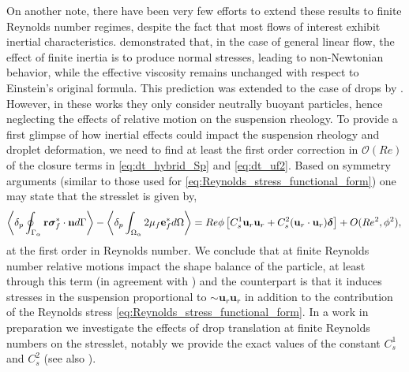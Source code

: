 On another note, there have been very few efforts to extend these results to finite Reynolds number regimes, despite the fact that most flows of interest exhibit inertial characteristics. 
\citet{stone2001inertial} demonstrated that, in the case of general linear flow, the effect of finite inertia is to produce normal stresses, leading to non-Newtonian behavior, while the effective viscosity remains unchanged with respect to Einstein's original formula. 
This prediction was extended to the case of drops by \citet{raja2010inertial}. 
However, in these works they only consider neutrally buoyant particles, hence neglecting the effects of relative motion on the suspension rheology. 
To provide a first glimpse of how inertial effects could impact the suspension rheology and droplet deformation, we need to find at least the first order correction in $\mathcal{O}(Re)$ of the closure terms in \ref{eq:dt_hybrid_Sp} and \ref{eq:dt_uf2}. 
Based on symmetry arguments (similar to those used for \ref{eq:Reynolds_stress_functional_form}) one may state that the stresslet is given by, 
\begin{equation}
    \left<\delta_{p} \oint_{\Gamma_{\alpha}} \textbf{r}\bm\sigma^*_f\cdot \textbf{n} d\Gamma\right>
    -\left<\delta_{p} \int_{\Omega_{\alpha}} 2\mu_f\textbf{e}^*_f d\Omega\right>
    =
    Re \phi 
    \left[
       C_s^1 \textbf{u}_{r}\textbf{u}_{r} 
    +  C_s^2 (\textbf{u}_{r}\cdot \textbf{u}_{r})\bm\delta
    \right]
    + O(Re^2,\phi^2),
    \\
\end{equation}
at the first order in Reynolds number. 
We conclude that at finite Reynolds number relative motions impact the shape balance of the particle, at least through this term (in agreement with \citet{taylor1964deformation}) and the counterpart is that it induces stresses in the suspension proportional to $\sim \textbf{u}_r\textbf{u}_r$ in addition to the contribution of the Reynolds stress \eqref{eq:Reynolds_stress_functional_form}. 
In a work in preparation we investigate the effects of drop translation at finite Reynolds numbers on the stresslet, notably we provide the exact values of the constant $C_s^{1}$ and $C_s^{2}$ (see also \citet{fintzi2025}). 
 


